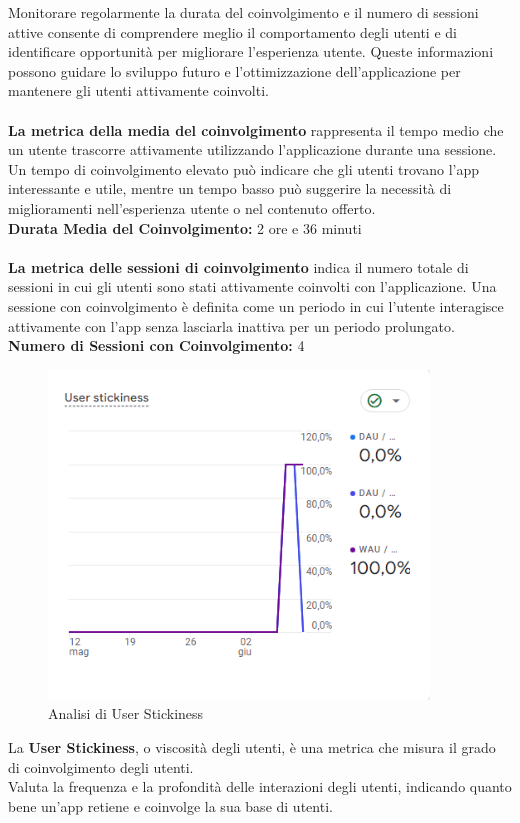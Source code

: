 \documentclass{article}
\begin{document}
		Monitorare regolarmente la durata del coinvolgimento e il numero di sessioni attive consente di comprendere meglio il comportamento degli utenti e di identificare opportunità per migliorare l'esperienza utente. Queste informazioni possono guidare lo sviluppo futuro e l'ottimizzazione dell'applicazione per mantenere gli utenti attivamente coinvolti.\\
		\\
		\textbf{La metrica della media del coinvolgimento} rappresenta il tempo medio che un utente trascorre attivamente utilizzando l'applicazione durante una sessione. Un tempo di coinvolgimento elevato può indicare che gli utenti trovano l'app interessante e utile, mentre un tempo basso può suggerire la necessità di miglioramenti nell'esperienza utente o nel contenuto offerto.\\
		\textbf{Durata Media del Coinvolgimento:} 2 ore e 36 minuti\\
		\\
		\textbf{La metrica delle sessioni di coinvolgimento} indica il numero totale di sessioni in cui gli utenti sono stati attivamente coinvolti con l'applicazione. Una sessione con coinvolgimento è definita come un periodo in cui l'utente interagisce attivamente con l'app senza lasciarla inattiva per un periodo prolungato.\\
		\textbf{Numero di Sessioni con Coinvolgimento:} 4\\
		\begin{center}
			\begin{figure}[H]
				\centering
				\includegraphics[width=0.9\textwidth]{Immagini/analisiuser}
				\caption{Analisi di User Stickiness}
			\end{figure}
		\end{center}
		La \textbf{User Stickiness}, o viscosità degli utenti, è una metrica che misura il grado di coinvolgimento degli utenti.\\
		Valuta la frequenza e la profondità delle interazioni degli utenti, indicando quanto bene un'app retiene e coinvolge la sua base di utenti.
		\newpage
		
\end{document}
